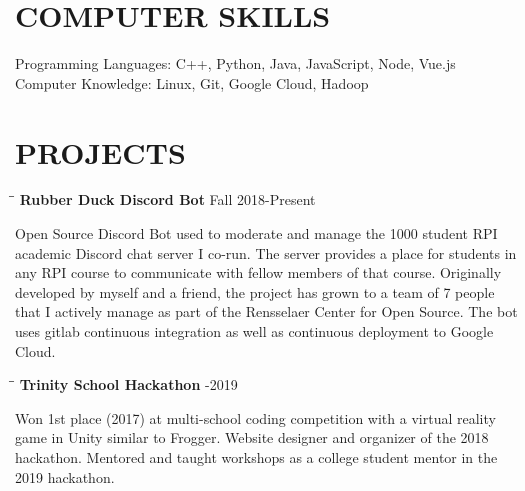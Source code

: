 \documentclass{res}
\begin{document}
\begin{resume}
\section{COMPUTER SKILLS}
    Programming Languages: C++, Python, Java, JavaScript, Node, Vue.js\\
    Computer Knowledge: Linux, Git, Google Cloud, Hadoop


\section{PROJECTS}
	\vspace{-0.1in}
	\begin{tabbing}
   \hspace{2.3in}\= \hspace{3.6in}\= \kill
    {\bf Rubber Duck Discord Bot} \>  \>Fall 2018-Present
   \end{tabbing}\vspace{-20pt}
	Open Source Discord Bot used to moderate and manage the 1000 student RPI academic Discord chat server I co-run. The server provides a place for students in any RPI course to communicate with fellow members of that course. Originally developed by myself and a friend, the project has grown to a team of 7 people that I actively manage as part of the Rensselaer Center for Open Source. The bot uses gitlab continuous integration as well as continuous deployment to Google Cloud.
	\vspace{-15pt}
	\begin{tabbing}
   \hspace{2.3in}\= \hspace{4in}\= \kill
    {\bf Trinity School Hackathon} \>  -2019
   \end{tabbing}\vspace{-20pt}
	Won 1st place (2017) at multi-school coding competition with a virtual reality game in Unity similar to Frogger. Website designer and organizer of the 2018 hackathon. Mentored and taught workshops as a college student mentor in the 2019 hackathon.



\end{resume}
\end{document}
